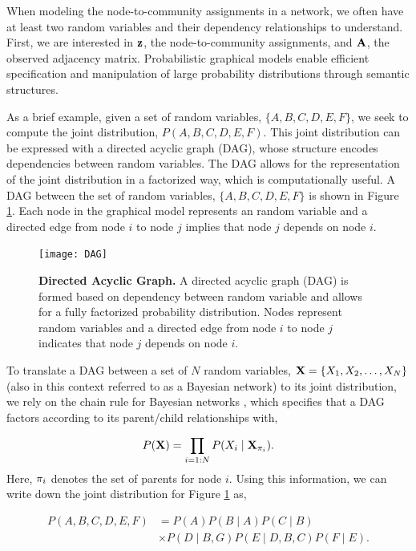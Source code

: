 When modeling the node-to-community assignments in a network, we often have at least two random variables and their dependency relationships to understand. First, we are interested in ${\bf z}$, the node-to-community assignments, and ${\bf A}$, the observed adjacency matrix. Probabilistic graphical models \cite{koller} enable efficient specification and manipulation of large probability distributions through semantic structures.

As a brief example, given a set of random variables, $\{A,B,C,D,E,F\}$, we seek to compute the joint distribution, $P(A,B,C,D,E,F)$. This joint distribution can be expressed with a directed acyclic graph (DAG), whose structure encodes dependencies between random variables. The DAG allows for the representation of the joint distribution in a factorized way, which is computationally useful. A DAG between the set of random variables, $\{A,B,C,D,E,F\}$ is shown in Figure \ref{fig:DAG}. Each node in the graphical model represents an random variable and a directed edge from node $i$ to node $j$ implies that node $j$ depends on node $i$. 

\begin{figure}
\begin{center}
\texttt{[image: DAG]}
\caption{{\bf Directed Acyclic Graph.} A directed acyclic graph (DAG) is formed based on dependency between random variable and allows for a fully factorized probability distribution. Nodes represent random variables and a directed edge from node $i$ to node $j$ indicates that node $j$ depends on node $i$.}
\label{fig:DAG}
\end{center}
\end{figure}

To translate a DAG between a set of $N$ random variables, ${\bf X}=\{X_{1},X_{2},\dots,X_{N}\}$ (also in this context referred to as a Bayesian network) to its joint distribution, we rely on the chain rule for Bayesian networks \cite{koller}, which specifies that a DAG factors according to its parent/child relationships with,

\begin{equation}
P({\bf X})=\prod_{i=1:N}P(X_{i} \mid {\bf X}_{\pi_{i}}).
\end{equation}
Here, ${\bf \pi}_{i}$ denotes the set of parents for node $i$. Using this information, we can write down the joint distribution for Figure \ref{fig:DAG} as,

\begin{equation}
\begin{split}
P(A,B,C,D,E,F)&=P(A)P(B\mid A)P(C\mid B)\\
&\times P(D \mid B,G)P(E \mid D,B,C)P(F\mid E).
\end{split}
\end{equation}

